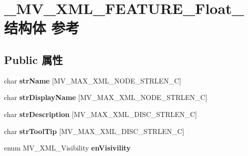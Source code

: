 \hypertarget{struct___m_v___x_m_l___f_e_a_t_u_r_e___float__}{}\section{\+\_\+\+M\+V\+\_\+\+X\+M\+L\+\_\+\+F\+E\+A\+T\+U\+R\+E\+\_\+\+Float\+\_\+结构体 参考}
\label{struct___m_v___x_m_l___f_e_a_t_u_r_e___float__}
\subsection*{Public 属性}
\begin{DoxyCompactItemize}
\item 
\mbox{\label{struct___m_v___x_m_l___f_e_a_t_u_r_e___float___a2f2287f9d08bff5657ef752dae3466f5}} 
char {\bfseries str\+Name} \mbox{[}M\+V\+\_\+\+M\+A\+X\+\_\+\+X\+M\+L\+\_\+\+N\+O\+D\+E\+\_\+\+S\+T\+R\+L\+E\+N\+\_\+C\mbox{]}
\item 
\mbox{\label{struct___m_v___x_m_l___f_e_a_t_u_r_e___float___a946c697f7b82f545c2e0cc363d61d75a}} 
char {\bfseries str\+Display\+Name} \mbox{[}M\+V\+\_\+\+M\+A\+X\+\_\+\+X\+M\+L\+\_\+\+N\+O\+D\+E\+\_\+\+S\+T\+R\+L\+E\+N\+\_\+C\mbox{]}
\item 
\mbox{\label{struct___m_v___x_m_l___f_e_a_t_u_r_e___float___a5d3e5b4fc357a625308ff1b8fe97b31e}} 
char {\bfseries str\+Description} \mbox{[}M\+V\+\_\+\+M\+A\+X\+\_\+\+X\+M\+L\+\_\+\+D\+I\+S\+C\+\_\+\+S\+T\+R\+L\+E\+N\+\_\+C\mbox{]}
\item 
\mbox{\label{struct___m_v___x_m_l___f_e_a_t_u_r_e___float___a5d55c68acaba1f3cb2d5596a1c9a48c7}} 
char {\bfseries str\+Tool\+Tip} \mbox{[}M\+V\+\_\+\+M\+A\+X\+\_\+\+X\+M\+L\+\_\+\+D\+I\+S\+C\+\_\+\+S\+T\+R\+L\+E\+N\+\_\+C\mbox{]}
\item 
\mbox{\label{struct___m_v___x_m_l___f_e_a_t_u_r_e___float___a8ef8db5dde5fa55d50c29fb22cd33f46}} 
enum M\+V\+\_\+\+X\+M\+L\+\_\+\+Visibility {\bfseries en\+Visivility}
\item 

\end{DoxyCompactItemize}
